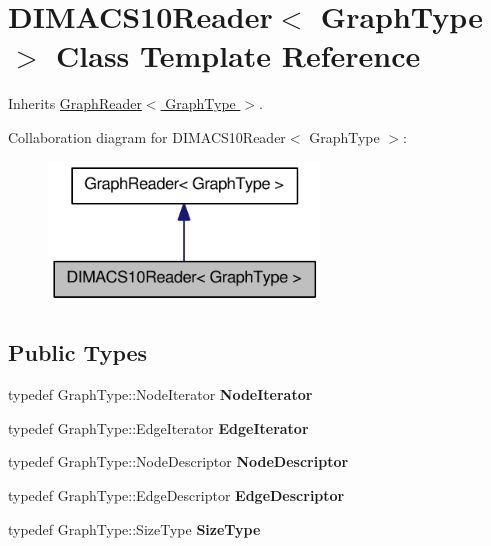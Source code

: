 \hypertarget{class_d_i_m_a_c_s10_reader}{
\section{DIMACS10Reader$<$ GraphType $>$ Class Template Reference}
\label{class_d_i_m_a_c_s10_reader}
}


Inherits \hyperlink{class_graph_reader}{GraphReader$<$ GraphType $>$}.



Collaboration diagram for DIMACS10Reader$<$ GraphType $>$:\nopagebreak
\begin{figure}[H]
\begin{center}
\leavevmode
\includegraphics[width=204pt]{class_d_i_m_a_c_s10_reader__coll__graph}
\end{center}
\end{figure}
\subsection*{Public Types}
\begin{DoxyCompactItemize}
\item 
\hypertarget{class_d_i_m_a_c_s10_reader_a60c261dcfca3f301f6044c1026fa6e81}{
typedef GraphType::NodeIterator {\bfseries NodeIterator}}
\label{class_d_i_m_a_c_s10_reader_a60c261dcfca3f301f6044c1026fa6e81}

\item 
\hypertarget{class_d_i_m_a_c_s10_reader_abc48d64fd0ab0012f923ba5c3bf721b0}{
typedef GraphType::EdgeIterator {\bfseries EdgeIterator}}
\label{class_d_i_m_a_c_s10_reader_abc48d64fd0ab0012f923ba5c3bf721b0}

\item 
\hypertarget{class_d_i_m_a_c_s10_reader_a071576374b22c321fe8af91256fb98d6}{
typedef GraphType::NodeDescriptor {\bfseries NodeDescriptor}}
\label{class_d_i_m_a_c_s10_reader_a071576374b22c321fe8af91256fb98d6}

\item 
\hypertarget{class_d_i_m_a_c_s10_reader_aec575d7547edbed4ccdcabbc6f662c7e}{
typedef GraphType::EdgeDescriptor {\bfseries EdgeDescriptor}}
\label{class_d_i_m_a_c_s10_reader_aec575d7547edbed4ccdcabbc6f662c7e}

\item 
\hypertarget{class_d_i_m_a_c_s10_reader_a6b7691eac4b9f255845fec0878c72ee1}{
typedef GraphType::SizeType {\bfseries SizeType}}
\label{class_d_i_m_a_c_s10_reader_a6b7691eac4b9f255845fec0878c72ee1}

\end{DoxyCompactItemize}
